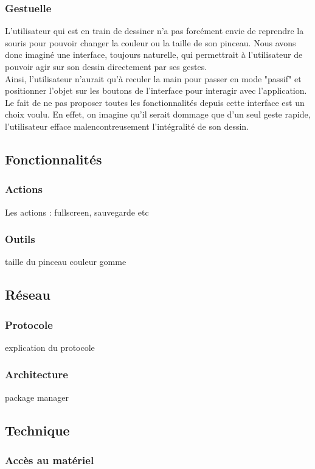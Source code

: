 \documentclass{report}
\begin{document}
			\subsubsection{Gestuelle}
				L'utilisateur qui est en train de dessiner n'a pas forcément envie de reprendre la souris pour pouvoir changer la couleur ou la taille de son pinceau. Nous avons donc imaginé une interface, toujours naturelle, qui permettrait à l'utilisateur de pouvoir agir sur son dessin directement par ses gestes. \\
				Ainsi, l'utilisateur n'aurait qu'à reculer la main pour passer en mode "passif" et positionner l'objet sur les boutons de l'interface pour interagir avec l'application. \\
				Le fait de ne pas proposer toutes les fonctionnalités depuis cette interface est un choix voulu. En effet, on imagine qu'il serait dommage que d'un seul geste rapide, l'utilisateur efface malencontreusement l'intégralité de son dessin. 
		\subsection{Fonctionnalités}
			\subsubsection{Actions}
				Les actions : fullscreen, sauvegarde etc
			\subsubsection{Outils}
				taille du pinceau couleur gomme
		\subsection{Réseau}
			\subsubsection{Protocole}
				explication du protocole
			\subsubsection{Architecture}
				package manager
		\subsection{Technique}
			\subsubsection{Accès au matériel}
\end{document}
